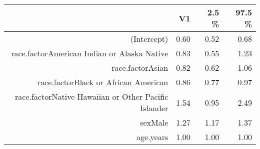 \begin{table}[ht]
\centering
\begin{tabular}{rrrr}
  \hline
 & V1 & 2.5 \% & 97.5 \% \\ 
  \hline
(Intercept) & 0.60 & 0.52 & 0.68 \\ 
  race.factorAmerican Indian or Alaska Native & 0.83 & 0.55 & 1.23 \\ 
  race.factorAsian & 0.82 & 0.62 & 1.06 \\ 
  race.factorBlack or African American & 0.86 & 0.77 & 0.97 \\ 
  race.factorNative Hawaiian or Other Pacific Islander & 1.54 & 0.95 & 2.49 \\ 
  sexMale & 1.27 & 1.17 & 1.37 \\ 
  age.years & 1.00 & 1.00 & 1.00 \\ 
   \hline
\end{tabular}
\end{table}
